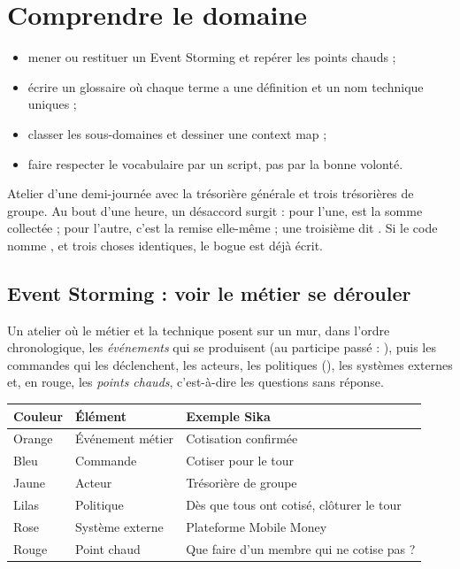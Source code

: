 \chapter{Comprendre le domaine}\label{ch:domaine}

\begin{objectifs}
\begin{itemize}
  \item mener ou restituer un Event Storming et repérer les points chauds ;
  \item écrire un glossaire où chaque terme a une définition et un nom technique uniques ;
  \item classer les sous-domaines et dessiner une context map ;
  \item faire respecter le vocabulaire par un script, pas par la bonne volonté.
\end{itemize}
\end{objectifs}

\begin{situation}
Atelier d'une demi-journée avec la trésorière générale et trois trésorières de groupe. Au bout d'une
heure, un désaccord surgit : pour l'une,  est la somme collectée ; pour l'autre, c'est la
remise elle-même ; une troisième dit . Si le code nomme ,  et
 trois choses identiques, le bogue est déjà écrit.
\end{situation}

\section{Event Storming : voir le métier se dérouler}
\begin{concept}
Un atelier où le métier et la technique posent sur un mur, dans l'ordre chronologique, les
\emph{événements} qui se produisent (au participe passé : ), puis les
commandes qui les déclenchent, les acteurs, les politiques (), les systèmes
externes et, en rouge, les \emph{points chauds}, c'est-à-dire les questions sans réponse.
\end{concept}

\noindent\begin{tabularx}{\linewidth}{lXX}
\toprule
\textbf{Couleur} & \textbf{Élément} & \textbf{Exemple Sika} \\ \midrule
Orange & Événement métier & Cotisation confirmée \\
Bleu & Commande & Cotiser pour le tour \\
Jaune & Acteur & Trésorière de groupe \\
Lilas & Politique & Dès que tous ont cotisé, clôturer le tour \\
Rose & Système externe & Plateforme Mobile Money \\
Rouge & Point chaud & Que faire d'un membre qui ne cotise pas ? \\
\bottomrule
\end{tabularx}

